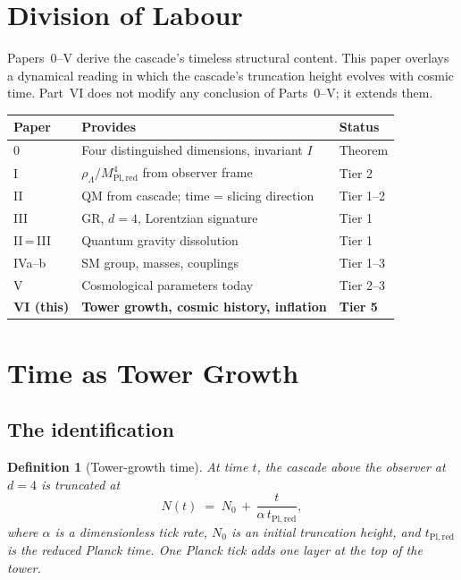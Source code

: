 \documentclass[12pt,a4paper]{article}
\newtheorem{definition}[theorem]{Definition}
\begin{document}
\tableofcontents
\newpage

\section{Division of Labour}\label{sec:division-of-labour}

Papers~0--V derive the cascade's timeless structural content. This paper overlays a dynamical reading in which the cascade's truncation height evolves with cosmic time. Part~VI does not modify any conclusion of Parts~0--V; it extends them.

\begin{center}
\begin{tabular}{lll}
\toprule
Paper & Provides & Status \\
\midrule
0~\cite{part0} & Four distinguished dimensions, invariant $I$ & Theorem \\
I~\cite{part1} & $\rho_\Lambda/M_{\mathrm{Pl,red}}^4$ from observer frame & Tier 2 \\
II~\cite{part2} & QM from cascade; time = slicing direction & Tier 1--2 \\
III~\cite{part3} & GR, $d = 4$, Lorentzian signature & Tier 1 \\
II\,=\,III~\cite{part23} & Quantum gravity dissolution & Tier 1 \\
IVa--b~\cite{part4a,part4b} & SM group, masses, couplings & Tier 1--3 \\
V~\cite{part5} & Cosmological parameters today & Tier 2--3 \\
\textbf{VI (this)} & \textbf{Tower growth, cosmic history, inflation} & \textbf{Tier 5} \\
\bottomrule
\end{tabular}
\end{center}

\section{Time as Tower Growth}\label{sec:time-as-tower-growth}

\subsection{The identification}

\begin{definition}[Tower-growth time]\label{def:tower-time}
At time $t$, the cascade above the observer at $d = 4$ is truncated at
\[
N(t) \;=\; N_0 \,+\, \frac{t}{\alpha\,t_{\mathrm{Pl,red}}},
\]
where $\alpha$ is a dimensionless tick rate, $N_0$ is an initial truncation
height, and $t_{\mathrm{Pl,red}}$ is the reduced Planck time. One Planck tick
adds one layer at the top of the tower.
\end{definition}
\end{document}
